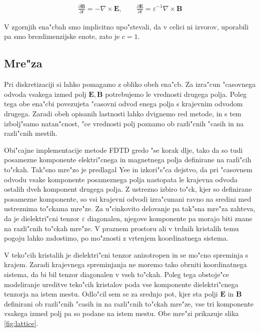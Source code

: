 \documentclass[a4paper,10pt]{article}
\newcommand{\odvod}[2]{\frac{\partial #1}{\partial #2}}
\renewcommand{\vec}{\mathbf}
\newcommand{\eps}{\varepsilon}
\newcommand{\E}{\vec E}
\newcommand{\B}{\vec B}
\begin{document}
\begin{align}
\label{eq:maxwell-base}
 \odvod{\vec{B}}{t} = -\nabla \times \vec{E}, \qquad \odvod{\vec{E}}{t} = \eps^{-1} \nabla \times \vec{B}
\end{align}

V zgornjih ena"cbah smo implicitno upo"stevali, da v celici ni izvorov, uporabili pa smo brezdimenzijske enote, zato je $c=1$.

\subsection{Mre"za}

Pri diskretizaciji si lahko pomagamo z obliko obeh ena"cb. 
Za izra"cun "casovnega odvoda vsakega izmed polj $\vec{E}, \vec{B}$ potrebujemo le vrednosti drugega polja. 
Poleg tega obe ena"cbi povezujeta "casovni odvod enega polja s krajevnim odvodom drugega. 
Zaradi obeh opisanih lastnosti lahko dvignemo red metode, in s tem izbolj"samo natan"cnost, "ce vrednosti polj poznamo ob razli"cnih "casih in na razli"cnih mestih. 

Obi"cajne implementacije metode FDTD gredo "se korak dlje, tako da so tudi posamezne komponente elektri"cnega in magnetnega polja definirane na razli"cih to"ckah\cite{yee, taflove, yee-lattice}.
Tak"sno mre"zo je predlagal Yee in izkori"s"ca dejstvo, da pri "casovnem odvodu vsake komponente posameznega polja nastopata le krajevna odvoda ostalih dveh komponent drugega polja. 
Z ustrezno izbiro to"ck, kjer so definirane posamezne komponente, so vsi krajevni odvodi izra"cunani ravno na sredini med ustreznima to"ckama mre"ze. 
Za u"cinkovito delovanje pa tak"sna mre"za zahteva, da je dielektri"cni tenzor $\eps$ diagonalen, njegove komponente pa morajo biti znane na razli"cnih to"ckah mre"ze. 
V praznem prostoru ali v trdnih kristalih temu pogoju lahko zadostimo, po mo"znosti z vrtenjem koordinatnega sistema.

V teko"cih kristalih je dielektri"cni tenzor anizotropen in se mo"cno spreminja s krajem. 
Zaradi krajevnega spreminjanja ne moremo tako obrniti koordinatnega sistema, da bi bil tenzor diagonalen v vseh to"ckah. 
Poleg tega obstoje"ce modeliranje ureditve teko"cih kristalov poda vse komponente dielektri"cnega tenzorja na istem mestu. 
Odlo"cil sem se za srednjo pot, kjer sta polji $\E$ in $\B$ definirani ob razli"cnih "casih in na razli"cnih to"ckah mre"ze, vse tri komponente vsakega izmed polj pa so podane na istem mestu. 
Obe mre"zi prikazuje slika \ref{fig:lattice}. 
\end{document}
